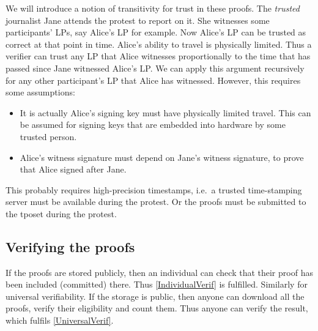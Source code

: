We will introduce a notion of transitivity for trust in these proofs.
The \emph{trusted} journalist Jane attends the protest to report on it.
She witnesses some participants' \acp{LP}, say Alice's \ac{LP} for example.
Now Alice's \ac{LP} can be trusted as correct at that point in time.
Alice's ability to travel is physically limited.
Thus a verifier can trust any \ac{LP} that Alice witnesses proportionally to 
the time that has passed since Jane witnessed Alice's \ac{LP}.
We can apply this argument recursively for any other participant's \ac{LP} that 
Alice has witnessed.
However, this requires some assumptions:
\begin{itemize}
  \item It is actually Alice's signing key must have physically limited travel.
    This can be assumed for signing keys that are embedded into hardware by 
    some trusted person.
  \item Alice's witness signature must depend on Jane's witness signature, to 
    prove that Alice signed after Jane.
\end{itemize}
\begin{remark}
  This probably requires high-precision timestamps, i.e.\ a trusted 
  time-stamping server must be available during the protest.
  Or the proofs must be submitted to the \ac{tposet} during the protest.
\end{remark}

\subsection{Verifying the proofs}

If the proofs are stored publicly, then an individual can check that their 
proof has been included (committed) there.
Thus \cref{IndividualVerif} is fulfilled.
Similarly for universal verifiability.
If the storage is public, then anyone can download all the proofs, verify their 
eligibility and count them.
Thus anyone can verify the result, which fulfils \cref{UniversalVerif}.



